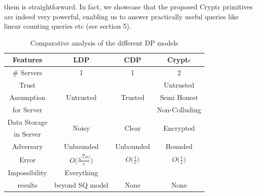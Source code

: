 them is straightforward. In fact, we showcase that the proposed Crypt$\epsilon$ primitives are indeed very powerful, enabling us to answer practically useful queries like linear counting queries etc (see section 5). 
\begin{table}[h!]
\centering
\caption {Comparative analysis of the different DP models}
 \begin{tabular}{c| c c c}  \toprule
\textbf{Features} & \textbf{LDP}  & \textbf{CDP}  & \textbf{Crypt$\epsilon$}  \\ [0.5ex] 
 \midrule \midrule \# Servers & 1& 1 & 2\\\hline
Trust  & & & Untrusted \\  Assumption & Untrusted & Trusted & Semi Honest \\for Server &  &   &  Non-Colluding  \\ \hline
Data Storage & \multirow{2}{*}{Noisy} & \multirow{2}{*}{Clear} & \multirow{2}{*}{Encrypted} \\in Server & &  &  \\\hline
Adversary & Unbounded & Unbounded & Bounded \\\hline
 Error & $O\Big(\frac{\sqrt(n)}{\epsilon}\Big)$& $O\Big(\frac{1}{\epsilon}\Big)$ & $O\Big(\frac{1}{\epsilon}\Big)$\\\hline
 Impossibility & Everything && \\results & beyond SQ model & None & None\footnotemark\\
  [1ex] 
 \bottomrule
 \end{tabular}
\end{table}

